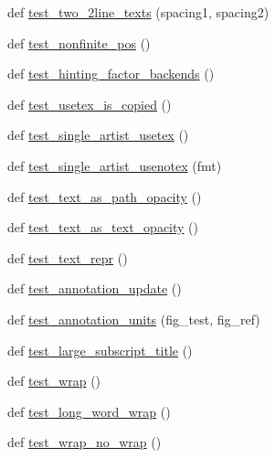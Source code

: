 \begin{DoxyCompactItemize}
def \hyperlink{namespacematplotlib_1_1tests_1_1test__text_aff236be7b9445ac3a0c4faccde9c533c}{test\+\_\+two\+\_\+2line\+\_\+texts} (spacing1, spacing2)
\item 
def \hyperlink{namespacematplotlib_1_1tests_1_1test__text_a7173cbf5b0962b5c2bc5190b222ac628}{test\+\_\+nonfinite\+\_\+pos} ()
\item 
def \hyperlink{namespacematplotlib_1_1tests_1_1test__text_aa01f3f5ff20cf0b20abcde71007c7b28}{test\+\_\+hinting\+\_\+factor\+\_\+backends} ()
\item 
def \hyperlink{namespacematplotlib_1_1tests_1_1test__text_a0bcaecabdf000f84f7131b0c2bdcc39a}{test\+\_\+usetex\+\_\+is\+\_\+copied} ()
\item 
def \hyperlink{namespacematplotlib_1_1tests_1_1test__text_a64c6da6ac0a35c2f47a76a874a725683}{test\+\_\+single\+\_\+artist\+\_\+usetex} ()
\item 
def \hyperlink{namespacematplotlib_1_1tests_1_1test__text_a208b675358628112817694f0a35d1184}{test\+\_\+single\+\_\+artist\+\_\+usenotex} (fmt)
\item 
def \hyperlink{namespacematplotlib_1_1tests_1_1test__text_a85a45596f96a282fa42882341b47e5c0}{test\+\_\+text\+\_\+as\+\_\+path\+\_\+opacity} ()
\item 
def \hyperlink{namespacematplotlib_1_1tests_1_1test__text_a1bfe1b81c867a73cf57a7255c28faa33}{test\+\_\+text\+\_\+as\+\_\+text\+\_\+opacity} ()
\item 
def \hyperlink{namespacematplotlib_1_1tests_1_1test__text_a0b3ee71f13ba7555897ab246c6828c0f}{test\+\_\+text\+\_\+repr} ()
\item 
def \hyperlink{namespacematplotlib_1_1tests_1_1test__text_a9b652e40099de4db1dfae4f6399c3076}{test\+\_\+annotation\+\_\+update} ()
\item 
def \hyperlink{namespacematplotlib_1_1tests_1_1test__text_af2a16518d74d3fa09510d99f1d73c022}{test\+\_\+annotation\+\_\+units} (fig\+\_\+test, fig\+\_\+ref)
\item 
def \hyperlink{namespacematplotlib_1_1tests_1_1test__text_a64364dee856edb36f59f4d22eebf53be}{test\+\_\+large\+\_\+subscript\+\_\+title} ()
\item 
def \hyperlink{namespacematplotlib_1_1tests_1_1test__text_afd27916ddd12f8a02090d7023cb902e6}{test\+\_\+wrap} ()
\item 
def \hyperlink{namespacematplotlib_1_1tests_1_1test__text_a58556ae7b78170a2175290f5698dd00b}{test\+\_\+long\+\_\+word\+\_\+wrap} ()
\item 
def \hyperlink{namespacematplotlib_1_1tests_1_1test__text_a098e301946e9d7f81d0608ecd05e9c0d}{test\+\_\+wrap\+\_\+no\+\_\+wrap} ()

\end{DoxyCompactItemize}
